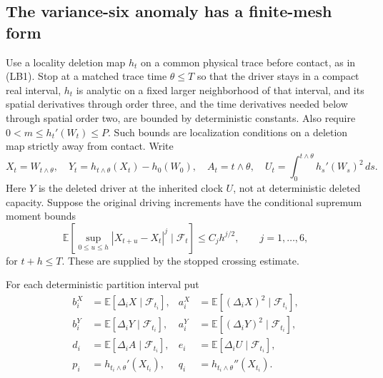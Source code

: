 \documentclass[11pt]{article}
\theoremstyle{definition}\newtheorem{definition}[theorem]{Definition}
\theoremstyle{remark}\newtheorem{remark}[theorem]{Remark}
\begin{document}
\subsection{The variance-six anomaly has a finite-mesh form}

Use a locality deletion map $h_t$ on a common physical trace before
contact, as in (LB1). Stop at a matched trace time $\theta\le T$ so
that the driver stays in a compact real interval, $h_t$ is analytic
on a fixed larger neighborhood of that interval, and its spatial
derivatives through order three, and the time derivatives needed
below through spatial order two, are bounded by deterministic
constants. Also require $0<m\le h_t'(W_t)\le P$. Such bounds are
localization conditions on a deletion map strictly away from contact.
Write
\[
 X_t=W_{t\wedge\theta},\quad
 Y_t=h_{t\wedge\theta}(X_t)-h_0(W_0),\quad
 A_t=t\wedge\theta,\quad
 U_t=\int_0^{t\wedge\theta}h_s'(W_s)^2\,ds.
 \tag{FM3}
\]
Here $Y$ is the deleted driver at the inherited clock $U$, not at
deterministic deleted capacity. Suppose the original driving
increments have the conditional supremum moment bounds
\[
 \mathbb E[\sup_{0\le u\le h}|X_{t+u}-X_t|^j
                         \mid\mathcal F_t]\le C_jh^{j/2},
 \qquad j=1,\ldots,6,
 \tag{FM4}
\]
for $t+h\le T$. These are supplied by the stopped crossing estimate.

For each deterministic partition interval put
\[
 \begin{aligned}
 b_i^X&=\mathbb E[\Delta_iX\mid\mathcal F_{t_i}],&
 a_i^X&=\mathbb E[(\Delta_iX)^2\mid\mathcal F_{t_i}],\\
 b_i^Y&=\mathbb E[\Delta_iY\mid\mathcal F_{t_i}],&
 a_i^Y&=\mathbb E[(\Delta_iY)^2\mid\mathcal F_{t_i}],\\
 d_i&=\mathbb E[\Delta_iA\mid\mathcal F_{t_i}],&
 e_i&=\mathbb E[\Delta_iU\mid\mathcal F_{t_i}],\\
 p_i&=h_{t_i\wedge\theta}'(X_{t_i}),&
 q_i&=h_{t_i\wedge\theta}''(X_{t_i}).
 \end{aligned}
 \tag{FM5}
\]
\end{document}
